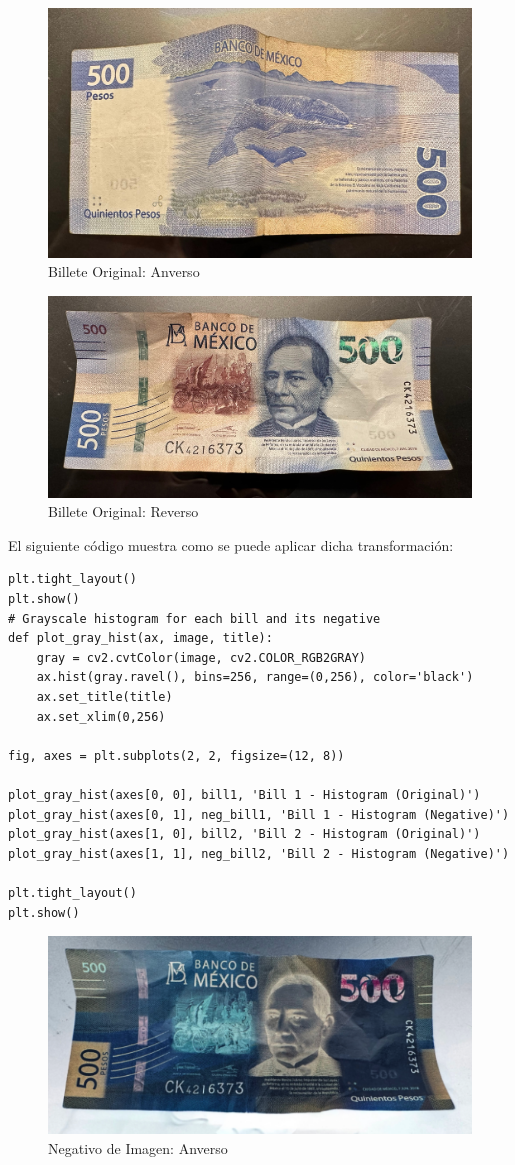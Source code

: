 \documentclass[12pt,letterpaper]{article}
\begin{document}
\begin{figure}[H]
  \centering
  \includegraphics[width=0.5\linewidth]{../data/billete-original/img1.jpg}
  \caption{Billete Original: Anverso}
  \label{fig:billete_original_1}
\end{figure}

\begin{figure}[H]
  \centering
  \includegraphics[width=0.5\linewidth]{../data/billete-original/img2.jpg}
  \caption{Billete Original: Reverso}
  \label{fig:billete_original_2}
\end{figure}

El siguiente código muestra como se puede aplicar dicha transformación:

\begin{verbatim}
plt.tight_layout()
plt.show()
# Grayscale histogram for each bill and its negative
def plot_gray_hist(ax, image, title):
    gray = cv2.cvtColor(image, cv2.COLOR_RGB2GRAY)
    ax.hist(gray.ravel(), bins=256, range=(0,256), color='black')
    ax.set_title(title)
    ax.set_xlim(0,256)

fig, axes = plt.subplots(2, 2, figsize=(12, 8))

plot_gray_hist(axes[0, 0], bill1, 'Bill 1 - Histogram (Original)')
plot_gray_hist(axes[0, 1], neg_bill1, 'Bill 1 - Histogram (Negative)')
plot_gray_hist(axes[1, 0], bill2, 'Bill 2 - Histogram (Original)')
plot_gray_hist(axes[1, 1], neg_bill2, 'Bill 2 - Histogram (Negative)')

plt.tight_layout()
plt.show()
\end{verbatim}

\begin{figure}[H]
  \centering
  \includegraphics[width=0.5\linewidth]{figuras/negativo1.png}
  \caption{Negativo de Imagen: Anverso}
  \label{fig:billete_negativo_1}
\end{figure}
\end{document}
